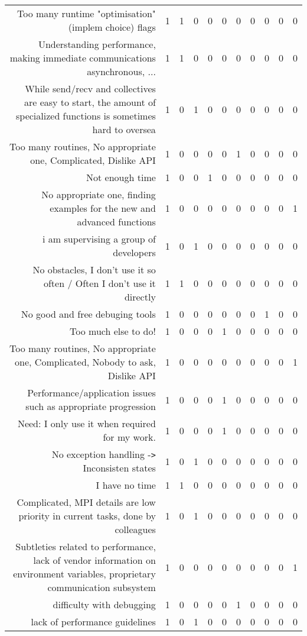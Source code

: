 {\begin{landscape}
\begin{longtable}[htb]{r|c|c|c|c|c|c|c|c|c|c}
{Too many runtime "optimisation" (implem choice) flags} & 1 & 1 & 0 & 0 & 0 & 0 & 0 & 0 & 0 & 0 \\%
{Understanding performance, making immediate communications asynchronous, ...} & 1 & 1 & 0 & 0 & 0 & 0 & 0 & 0 & 0 & 0 \\%
{While send/recv and collectives are easy to start, the amount of specialized functions is sometimes hard to oversea} & 1 & 0 & 1 & 0 & 0 & 0 & 0 & 0 & 0 & 0 \\%
{Too many routines, No appropriate one, Complicated, Dislike API} & 1 & 0 & 0 & 0 & 0 & 1 & 0 & 0 & 0 & 0 \\%
{Not enough time} & 1 & 0 & 0 & 1 & 0 & 0 & 0 & 0 & 0 & 0 \\%
{No appropriate one, finding examples for the new and advanced functions} & 1 & 0 & 0 & 0 & 0 & 0 & 0 & 0 & 0 & 1 \\%
{i am supervising a group of developers} & 1 & 0 & 1 & 0 & 0 & 0 & 0 & 0 & 0 & 0 \\%
{No obstacles, I don't use it so often / Often I don't use it directly} & 1 & 1 & 0 & 0 & 0 & 0 & 0 & 0 & 0 & 0 \\%
{No good and free debuging tools} & 1 & 0 & 0 & 0 & 0 & 0 & 0 & 1 & 0 & 0 \\%
{Too much else to do!} & 1 & 0 & 0 & 0 & 1 & 0 & 0 & 0 & 0 & 0 \\%
{Too many routines, No appropriate one, Complicated, Nobody to ask, Dislike API} & 1 & 0 & 0 & 0 & 0 & 0 & 0 & 0 & 0 & 1 \\%
{Performance/application issues such as appropriate progression} & 1 & 0 & 0 & 0 & 1 & 0 & 0 & 0 & 0 & 0 \\%
{Need: I only use it when required for my work.} & 1 & 0 & 0 & 0 & 1 & 0 & 0 & 0 & 0 & 0 \\%
{No exception handling -\verb!>! Inconsisten states} & 1 & 0 & 1 & 0 & 0 & 0 & 0 & 0 & 0 & 0 \\%
{I have no time} & 1 & 1 & 0 & 0 & 0 & 0 & 0 & 0 & 0 & 0 \\%
{Complicated, MPI details are low priority in current tasks, done by colleagues} & 1 & 0 & 1 & 0 & 0 & 0 & 0 & 0 & 0 & 0 \\%
{Subtleties related to performance, lack of vendor information on environment variables, proprietary communication subsystem} & 1 & 0 & 0 & 0 & 0 & 0 & 0 & 0 & 0 & 1 \\%
{difficulty with debugging} & 1 & 0 & 0 & 0 & 0 & 1 & 0 & 0 & 0 & 0 \\%
{lack of performance guidelines} & 1 & 0 & 1 & 0 & 0 & 0 & 0 & 0 & 0 & 0 \\%

\end{longtable}
\end{landscape}}
